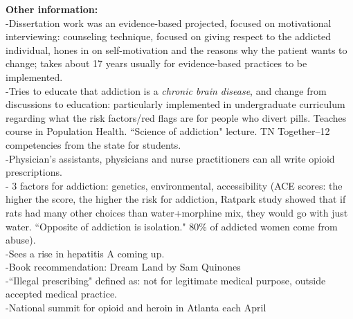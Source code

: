 \documentclass[12pt]{article}
\begin{document}
\noindent \textbf{Other information:} \\
-Dissertation work was an evidence-based projected, focused on motivational interviewing: counseling technique, focused on giving respect to the addicted individual, hones in on self-motivation and the reasons why the patient wants to change; takes about 17 years usually for evidence-based practices to be implemented. \\
-Tries to educate that addiction is a \textit{chronic brain disease}, and change from discussions to education: particularly implemented in undergraduate curriculum regarding what the risk factors/red flags are for people who divert pills. Teaches course in Population Health. ``Science of addiction" lecture. TN Together--12 competencies from the state for students.  \\
-Physician's assistants, physicians and nurse practitioners can all write opioid prescriptions. \\
- 3 factors for addiction: genetics, environmental, accessibility (ACE scores: the higher the score, the higher the risk for addiction, Ratpark study showed that if rats had many other choices than water+morphine mix, they would go with just water. ``Opposite of addiction is isolation." 80\% of addicted women come from abuse). \\%
-Sees a rise in hepatitis A coming up. \\
-Book recommendation: Dream Land by Sam Quinones \\
-``Illegal prescribing" defined as: not for legitimate medical purpose, outside accepted medical practice. \\
-National summit for opioid and heroin in Atlanta each April   \\
\end{document}
